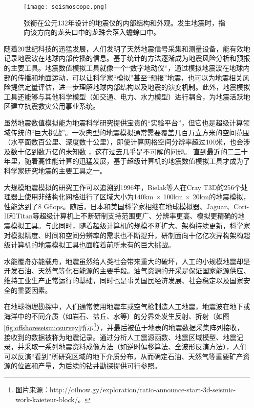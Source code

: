 \begin{figure}[ht]
\centering
\texttt{[image: seismoscope.png]}
\caption{张衡在公元132年设计的地震仪的内部结构和外观\citep{hsiao2009review}。发生地震时，指向该方向的龙头口中的龙珠会落入蟾蜍口中。}
\label{fig:heng-scope}
\end{figure}

随着20世纪科技的迅猛发展，人们发明了天然地震信号采集和测量设备，能有效地记录地震波在地球内部传播的信息。基于统计的方法逐渐成为地震风险分析和预报的主要工具。地震数值模拟工具就像一个“数字地动仪”，通过模拟地震波在地球内部的传播和地面运动，可以让科学家“模拟”甚至“预报”地震，也可以为地震相关风险提供定量评估，进一步理解地球内部结构以及地震的演变机制。此外，地震模拟工具还能够与其他科学模型（如交通、电力、水力模型）进行耦合，为地震活跃地区建立抗震救灾公用事业系统。

虽然地震数值模拟能为地震科学研究提供宝贵的“实验平台”，但它也是超级计算领域传统的“巨大挑战”。一次典型的地震模拟通常需要覆盖几百万立方米的空间范围（水平面数百公里、深度数十公里），即使计算网格空间分辨率超过100米，也会涉及数十亿到数万亿的未知数 \citep{cui2010scalable}，这在过去几乎是不可解的问题。 直到最近的二三十年里，随着高性能计算的迅猛发展，基于超级计算机的地震数值模拟工具才成为了科学家研究地震的主要工具之一。

大规模地震模拟的研究工作可以追溯到1996年，Bielak等人在Cray T3D的256个处理器上使用非结构化网格进行了区域大小为140km $\times$ 100km $\times$ 20km的地震模拟\citep{bao1996earthquake}，性能达到了8 Gflops。随后，日本和美国科学家相继在地球模拟器\cite{chen2006glueball}、Jaguar\cite{carrington2008high}、Cori-II\citep{breuer2017edge}和Titan\cite{cui2013physics}等超级计算机上不断研制支持范围更广、分辨率更高、模拟更精确的地震模拟工具。与此同时，随着超级计算机的规模不断扩大、架构持续更新，科学家对模拟精度、时间和空间分辨率的需求也不断提升，研制面向十亿亿次异构架构超级计算机的地震模拟工具也面临着前所未有的巨大挑战。


水能覆舟亦能载舟，地震虽然给人类社会带来重大的破坏，人工的小规模地震却是开发石油、天然气等化石能源的主要手段。油气资源的开采是保证国家能源供应、维持工业生产正常运行的基础，同时也是事关国民经济发展、社会稳定以及国家安全的重要因素\cite{甘霖2016面向地球科学数值模拟的可重构计算方法研究}。

在地球物理勘探中，人们通常使用地震车或空气枪制造人工地震，地震波在地下或海洋中的不同介质（如岩石、盐丘、水等）的分界处发生反射、折射（如图\ref{fig:offshoreseismicsurvey}所示\footnote{图片来源：http://oilnow.gy/exploration/ratio-announce-start-3d-seismic-work-kaieteur-block/。}），并最后被位于地表的地震数据采集阵列接收，接收到的数据被称为地震记录。通过分析人工震源函数、地震区域模型、地震记录，并采取一系列地震资料成像方法（如逆时偏移算法、全波形反演方法），人们可以反演“看到”所研究区域的地下介质分布，从而确定石油、天然气等重要矿产资源的位置和产量，为后续的钻井勘探提供可行参照。


